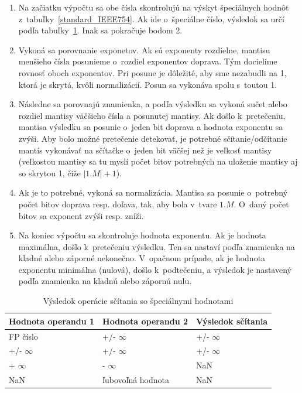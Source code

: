 \begin{enumerate}  
\item Na začiatku výpočtu sa obe čísla skontrolujú na výskyt špeciálnych hodnôt z~tabuľky~\ref{standard_IEEE754}. Ak ide o~špeciálne číslo, výsledok sa určí podľa tabuľky~\ref{special_plus}. Inak sa pokračuje bodom 2.

\item Vykoná sa porovnanie exponetov. Ak sú exponenty rozdielne, mantisu menšieho čísla posunieme o~rozdiel exponentov doprava. Tým docielime rovnosť oboch exponentov. Pri posune je dôležité, aby sme nezabudli na 1, ktorá je skrytá, kvôli normalizácií. Posun sa vykonáva spolu s~toutou 1. 

\item Následne sa porovnajú znamienka, a podľa výsledku sa vykoná sučet alebo rozdiel mantisy väčšieho čísla a posunutej mantisy. Ak došlo k~pretečeniu, mantisa výsledku sa posunie o~jeden bit doprava a hodnota exponentu sa zvýši. Aby bolo možné pretečenie detekovať, je potrebné sčítanie/odčítanie mantís vykonávať na sčítačke o~jeden bit väčšej než je veľkosť mantisy (veľkostou mantisy sa tu myslí počet bitov potrebných na uloženie mantisy aj so skrytou 1, čiže $ |1.M| + 1 $).

\item Ak je to potrebné, vykoná sa normalizácia. Mantisa sa posunie o~potrebný počet bitov doprava resp. doľava, tak, aby bola v~tvare $ 1.M $. O~daný počet bitov sa exponent zvýši resp. zníži.

\item Na koniec výpočtu sa skontroluje hodnota exponentu. Ak je hodnota maximálna, došlo k~pretečeniu výsledku. Ten sa nastaví podľa znamienka na kladné alebo záporné nekonečno. V~opačnom prípade, ak je hodnota exponentu minimálna (nulová), došlo k~podtečeniu, a výsledok je nastavený podľa znamienka na kladnú alebo zápornú nulu.
\end{enumerate}


\begin{table}[h]
\centering
\begin{tabular}{|l|l|l|}
\hline
\rowcolor[HTML]{C0C0C0} 
Hodnota operandu 1 & Hodnota operandu 2 & Výsledok sčítania \\ \hline
FP číslo           & +/- $ \infty $     & +/- $ \infty $    \\ \hline
+/- $ \infty $     & +/- $ \infty $     & +/- $ \infty $    \\ \hline
+ $ \infty $       & - $ \infty $       & NaN               \\ \hline
NaN                & ľubovoľná hodnota  & NaN               \\ \hline
\end{tabular}
\caption{Výsledok operácie sčítania so špeciálnymi hodnotami}
\label{special_plus}
\end{table}

